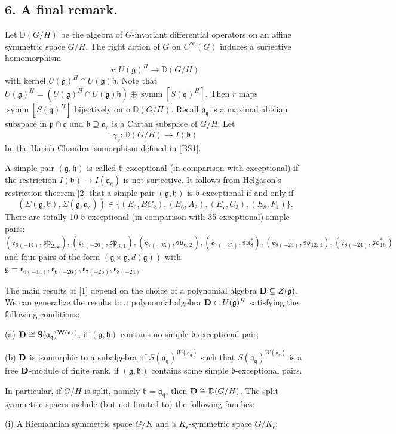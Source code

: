 \documentclass[a4paper]{amsart}
\theoremstyle{plain}
\theoremstyle{definition}
\def\symm{\operatorname{symm}}
\newcommand{\fra}{\mathfrak{a}}
\newcommand{\frb}{\mathfrak{b}}
\newcommand{\fre}{\mathfrak{e}}
\newcommand{\frg}{\mathfrak{g}}
\newcommand{\frh}{\mathfrak{h}}
\newcommand{\fro}{\mathfrak{o}}
\newcommand{\frp}{\mathfrak{p}}
\newcommand{\frq}{\mathfrak{q}}
\newcommand{\frs}{\mathfrak{s}}
\newcommand{\fru}{\mathfrak{u}}
\newcommand{\bbD}{\mathbb{D}}
\begin{document}
\subsection*{6. A final remark.} Let ${\bbD}(G/H)$ be the algebra of $G$-invariant differential operators on an affine symmetric space $G/H$. The right action of $G$ on $C^\infty(G)$ induces a surjective
homomorphism
$$r\colon U(\frg)^H \rightarrow \bbD(G/H)$$
with kernel $U(\frg)^H\cap U(\frg)\frh$.  Note that $U(\frg)^H=(U(\frg)^H\cap U(\frg)\frh)\oplus \symm[S(\frq)^H]$.
 Then $r$ maps $\symm[S(\frq)^H]$ bijectively onto $\bbD(G/H)$.
Recall $\fra_\frq$ is a maximal abelian subspace in $\frp\cap \frq$
and  $\frb\supseteq \fra_\frq$ is a Cartan subspace of $G/H$.  Let
$$\gamma_\frb: \bbD(G/H)\rightarrow I(\frb)$$
be the Harish-Chandra isomorphism defined in [BS1].

A simple pair $(\frg,\frh)$ is called $\frb$-exceptional (in comparison with exceptional)
if the restriction $I(\frb)\rightarrow I(\fra_\frq)$ is not surjective.
It follows from Helgason's restriction theorem [2] that a simple  pair  $(\frg,\frh)$ is $\frb$-exceptional if and only if
$$(\Sigma(\frg,\frb),\Sigma(\frg,\fra_\frq)) \in
\{(E_6,BC_2),(E_6,A_2),(E_7,C_3),(E_8,F_4)\}.$$
There are totally 10 $\frb$-exceptional (in comparison with 35 exceptional) simple pairs:
$$(\fre_{6(-14)},\frs\frp_{2,2}), (\fre_{6(-26)},\frs\frp_{3,1}), (\fre_{7(-25)},\frs\fru_{6,2}),
(\fre_{7(-25)},\frs\fru^*_{8}), (\fre_{8(-24)},\frs\fro_{12,4}), (\fre_{8(-24)},\frs\fro^*_{16})$$
and four pairs of the form $(\frg\times \frg,d(\frg))$
with $\frg=\fre_{6(-14)},\fre_{6(-26)},\fre_{7(-25)},\fre_{8(-24)}$.

The main results of [1] depend on the choice of a polynomial algebra ${\bf D}\subseteq Z(\frg)$.
We can generalize the results to a polynomial algebra ${\bf D}\subset U(\frg)^H$ satisfying the following conditions:

(a) $\bf D\cong S(\fra_\frq)^{W(\fra_\frq)}$, if $(\frg,\frh)$ contains no simple
$\frb$-exceptional pair;

(b)  $\bf D$ is isomorphic to a subalgebra of $S(\fra_\frq)^{W(\fra_\frq)}$ such that $S(\fra_\frq)^{W(\fra_\frq)}$ is
a free $\bf D$-module  of finite rank, if $(\frg,\frh)$ contains some simple
$\frb$-exceptional pairs.

\noindent In particular, if $G/H$ is split, namely $\frb=\fra_\frq$, then ${\bf D}\cong {\bbD}(G/H)$.
The split symmetric spaces include (but not limited to) the following families:

(i) A Riemannian symmetric space $G/K$ and a $K_\epsilon$-symmetric space $G/K_\epsilon$;
\end{document}
